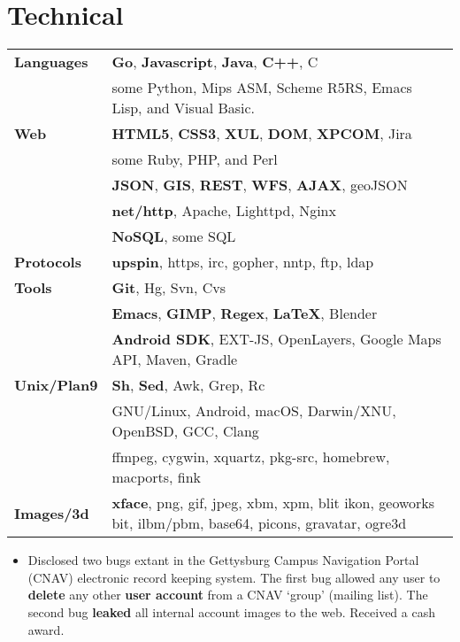 \documentclass[11pt]{article}
\begin{document}
\section*{Technical}
\begin{tabular}{ l l }
  	\textbf{Languages} & \textbf{Go}, \textbf{Javascript}, \textbf{Java}, \textbf{C++}, C \\
  	& some Python, Mips ASM, Scheme R5RS, Emacs Lisp, and  Visual Basic. \\
  	
  	\textbf{Web} & \textbf{HTML5}, \textbf{CSS3}, \textbf{XUL}, \textbf{DOM}, \textbf{XPCOM}, Jira \\
  	& some Ruby, PHP, and Perl \\
  	& \textbf{JSON}, \textbf{GIS}, \textbf{REST}, \textbf{WFS}, \textbf{AJAX}, geoJSON \\
  	& \textbf{net/http}, Apache, Lighttpd, Nginx \\
  	& \textbf{NoSQL}, some SQL \\
  	\textbf{Protocols} & \textbf{upspin}, https, irc, gopher, nntp, ftp, ldap \\
  	
  	\textbf{Tools} & \textbf{Git}, Hg, Svn, Cvs \\
  	& \textbf{Emacs}, \textbf{GIMP}, \textbf{Regex}, \textbf{\LaTeX}, Blender \\
  	& \textbf{Android SDK}, EXT-JS, OpenLayers, Google Maps API, Maven, Gradle \\
  	
  	\textbf{Unix/Plan9} & \textbf{Sh}, \textbf{Sed}, Awk, Grep, Rc \\
  	& GNU/Linux, Android, macOS, Darwin/XNU, OpenBSD, GCC, Clang \\
  	& ffmpeg, cygwin, xquartz, pkg-src, homebrew, macports, fink \\
  	\textbf{Images/3d} & \textbf{xface}, png, gif, jpeg, xbm, xpm, blit ikon, geoworks bit, ilbm/pbm, base64, picons, gravatar, ogre3d \\
\end{tabular}
\begin{itemize}
	\item Disclosed two bugs extant in the Gettysburg Campus Navigation Portal (CNAV) electronic record keeping system. The first bug allowed any user to \textbf{delete} any other \textbf{user account} from a CNAV `group' (mailing list). The second bug \textbf{leaked} all internal account images to the web. Received a cash award.
\end{itemize}
\end{document}
